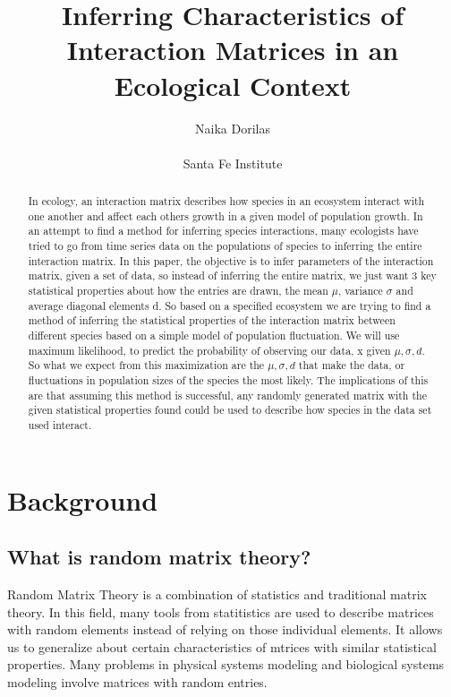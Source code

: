 \documentclass{article}
\begin{document}
\title{Inferring Characteristics of Interaction Matrices in an Ecological Context{}}
\author{Naika Dorilas\\\\{Santa Fe Institute}}

\maketitle

\begin{abstract}
In ecology, an interaction matrix describes how species in an ecosystem interact with one another and affect each others growth in a given model of population growth. In an attempt to find a method for inferring species interactions, many ecologists have tried to go from time series data on the populations of species to inferring the entire interaction matrix. In this paper, the objective is to infer parameters of the interaction matrix, given a set of data, so instead of inferring the entire matrix, we just want 3 key statistical properties about how the entries are drawn, the mean $\mu$, variance $\sigma$ and average diagonal elements d. So based on a specified ecosystem we are trying to find a method of inferring the statistical properties of the interaction matrix between different species based on a simple model of population fluctuation. We will use maximum likelihood, to predict the probability of observing our data, x given $\mu, \sigma, d$. So what we expect from this maximization are the $\mu,\sigma,d$ that make the data, or fluctuations in population sizes of the species the most likely. The implications of this are that assuming this method is successful, any randomly generated matrix with the given statistical properties found could be used to describe how species in the data set used interact.
\end{abstract}

\section{Background}

\subsection{What is random matrix theory?}
\hfill\break
Random Matrix Theory is a combination of statistics and traditional matrix theory. In this field, many tools from statitistics are used to describe matrices with random elements instead of relying on those individual elements. It allows us to generalize about certain characteristics of mtrices with similar statistical properties. Many problems in physical systems modeling and biological systems modeling involve matrices with random entries. \hfill\break
\end{document}
